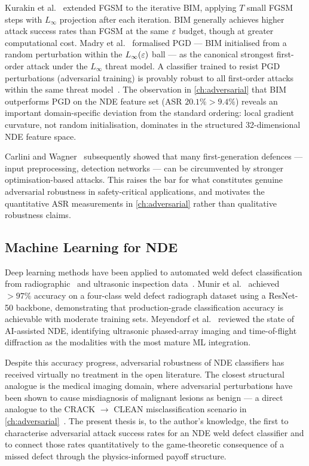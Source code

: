 Kurakin et al.~\cite{Kurakin2017} extended FGSM to the iterative
\ac{BIM}, applying $T$ small FGSM steps with $L_\infty$ projection
after each iteration.  BIM generally achieves higher attack success
rates than FGSM at the same $\varepsilon$ budget, though at greater
computational cost.  Madry et al.~\cite{Madry2018} formalised \ac{PGD}
— BIM initialised from a random perturbation within the $L_\infty(\varepsilon)$
ball — as the canonical strongest first-order attack under the $L_\infty$
threat model.  A classifier trained to resist PGD perturbations
(adversarial training) is provably robust to all first-order attacks
within the same threat model~\cite{Madry2018}.  The observation in
\cref{ch:adversarial} that BIM outperforms PGD on the NDE feature set
(ASR $\num{20.1}\% > \num{9.4}\%$) reveals an important domain-specific
deviation from the standard ordering: local gradient curvature, not
random initialisation, dominates in the structured 32-dimensional NDE
feature space.

Carlini and Wagner~\cite{Carlini2017} subsequently showed that many
first-generation defences — input preprocessing, detection networks —
can be circumvented by stronger optimisation-based attacks.  This raises
the bar for what constitutes genuine adversarial robustness in
safety-critical applications, and motivates the quantitative ASR
measurements in \cref{ch:adversarial} rather than qualitative
robustness claims.

\subsection{Machine Learning for NDE}
\label{subsec:lit_nde_ml}

Deep learning methods have been applied to automated weld defect
classification from radiographic~\cite{Munir2019} and ultrasonic
inspection data~\cite{Meyendorf2022}.  Munir et al.~\cite{Munir2019}
achieved $>97\%$ accuracy on a four-class weld defect radiograph dataset
using a ResNet-50 backbone, demonstrating that production-grade
classification accuracy is achievable with moderate training sets.
Meyendorf et al.~\cite{Meyendorf2022} reviewed the state of AI-assisted
NDE, identifying ultrasonic phased-array imaging and time-of-flight
diffraction as the modalities with the most mature ML integration.

Despite this accuracy progress, adversarial robustness of NDE
classifiers has received virtually no treatment in the open literature.
The closest structural analogue is the medical imaging domain, where
adversarial perturbations have been shown to cause misdiagnosis of
malignant lesions as benign — a direct analogue to the CRACK $\to$ CLEAN
misclassification scenario in \cref{ch:adversarial}~\cite{Goodfellow2016}.
The present thesis is, to the author's knowledge, the first to
characterise adversarial attack success rates for an NDE weld defect
classifier and to connect those rates quantitatively to the game-theoretic
consequence of a missed defect through the physics-informed payoff structure.

